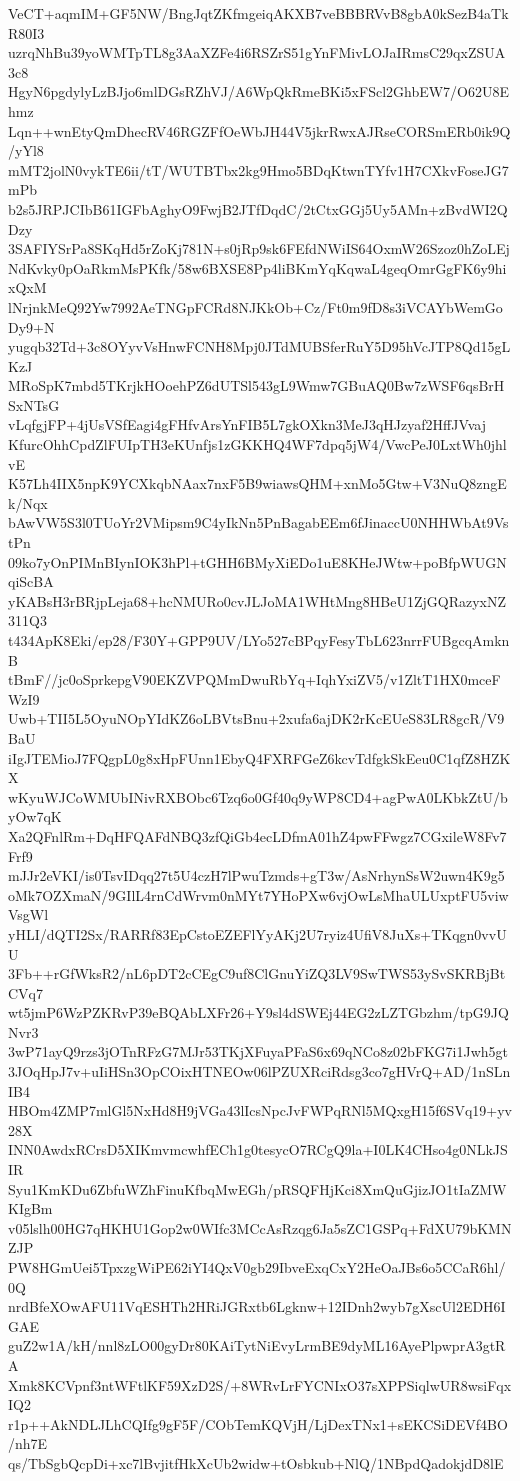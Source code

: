 VeCT+aqmIM+GF5NW/BngJqtZKfmgeiqAKXB7veBBBRVvB8gbA0kSezB4aTkR80I3
uzrqNhBu39yoWMTpTL8g3AaXZFe4i6RSZrS51gYnFMivLOJaIRmsC29qxZSUA3c8
HgyN6pgdylyLzBJjo6mlDGsRZhVJ/A6WpQkRmeBKi5xFScl2GhbEW7/O62U8Ehmz
Lqn++wnEtyQmDhecRV46RGZFfOeWbJH44V5jkrRwxAJRseCORSmERb0ik9Q/yYl8
mMT2jolN0vykTE6ii/tT/WUTBTbx2kg9Hmo5BDqKtwnTYfv1H7CXkvFoseJG7mPb
b2s5JRPJCIbB61IGFbAghyO9FwjB2JTfDqdC/2tCtxGGj5Uy5AMn+zBvdWI2QDzy
3SAFIYSrPa8SKqHd5rZoKj781N+s0jRp9sk6FEfdNWiIS64OxmW26Szoz0hZoLEj
NdKvky0pOaRkmMsPKfk/58w6BXSE8Pp4liBKmYqKqwaL4geqOmrGgFK6y9hixQxM
lNrjnkMeQ92Yw7992AeTNGpFCRd8NJKkOb+Cz/Ft0m9fD8s3iVCAYbWemGoDy9+N
yugqb32Td+3c8OYyvVsHnwFCNH8Mpj0JTdMUBSferRuY5D95hVcJTP8Qd15gLKzJ
MRoSpK7mbd5TKrjkHOoehPZ6dUTSl543gL9Wmw7GBuAQ0Bw7zWSF6qsBrHSxNTsG
vLqfgjFP+4jUsVSfEagi4gFHfvArsYnFIB5L7gkOXkn3MeJ3qHJzyaf2HffJVvaj
KfurcOhhCpdZlFUIpTH3eKUnfjs1zGKKHQ4WF7dpq5jW4/VwcPeJ0LxtWh0jhlvE
K57Lh4IIX5npK9YCXkqbNAax7nxF5B9wiawsQHM+xnMo5Gtw+V3NuQ8zngEk/Nqx
bAwVW5S3l0TUoYr2VMipsm9C4yIkNn5PnBagabEEm6fJinaccU0NHHWbAt9VstPn
09ko7yOnPIMnBIynIOK3hPl+tGHH6BMyXiEDo1uE8KHeJWtw+poBfpWUGNqiScBA
yKABsH3rBRjpLeja68+hcNMURo0cvJLJoMA1WHtMng8HBeU1ZjGQRazyxNZ311Q3
t434ApK8Eki/ep28/F30Y+GPP9UV/LYo527cBPqyFesyTbL623nrrFUBgcqAmknB
tBmF//jc0oSprkepgV90EKZVPQMmDwuRbYq+IqhYxiZV5/v1ZltT1HX0mceFWzI9
Uwb+TII5L5OyuNOpYIdKZ6oLBVtsBnu+2xufa6ajDK2rKcEUeS83LR8gcR/V9BaU
iIgJTEMioJ7FQgpL0g8xHpFUnn1EbyQ4FXRFGeZ6kcvTdfgkSkEeu0C1qfZ8HZKX
wKyuWJCoWMUbINivRXBObc6Tzq6o0Gf40q9yWP8CD4+agPwA0LKbkZtU/byOw7qK
Xa2QFnlRm+DqHFQAFdNBQ3zfQiGb4ecLDfmA01hZ4pwFFwgz7CGxileW8Fv7Frf9
mJJr2eVKI/is0TsvIDqq27t5U4czH7lPwuTzmds+gT3w/AsNrhynSsW2uwn4K9g5
oMk7OZXmaN/9GIlL4rnCdWrvm0nMYt7YHoPXw6vjOwLsMhaULUxptFU5viwVsgWl
yHLI/dQTI2Sx/RARRf83EpCstoEZEFlYyAKj2U7ryiz4UfiV8JuXs+TKqgn0vvUU
3Fb++rGfWksR2/nL6pDT2cCEgC9uf8ClGnuYiZQ3LV9SwTWS53ySvSKRBjBtCVq7
wt5jmP6WzPZKRvP39eBQAbLXFr26+Y9sl4dSWEj44EG2zLZTGbzhm/tpG9JQNvr3
3wP71ayQ9rzs3jOTnRFzG7MJr53TKjXFuyaPFaS6x69qNCo8z02bFKG7i1Jwh5gt
3JOqHpJ7v+uIiHSn3OpCOixHTNEOw06lPZUXRciRdsg3co7gHVrQ+AD/1nSLnIB4
HBOm4ZMP7mlGl5NxHd8H9jVGa43lIcsNpcJvFWPqRNl5MQxgH15f6SVq19+yv28X
INN0AwdxRCrsD5XIKmvmcwhfECh1g0tesycO7RCgQ9la+I0LK4CHso4g0NLkJSIR
Syu1KmKDu6ZbfuWZhFinuKfbqMwEGh/pRSQFHjKci8XmQuGjizJO1tIaZMWKIgBm
v05lslh00HG7qHKHU1Gop2w0WIfc3MCcAsRzqg6Ja5sZC1GSPq+FdXU79bKMNZJP
PW8HGmUei5TpxzgWiPE62iYI4QxV0gb29IbveExqCxY2HeOaJBs6o5CCaR6hl/0Q
nrdBfeXOwAFU11VqESHTh2HRiJGRxtb6Lgknw+12IDnh2wyb7gXscUl2EDH6IGAE
guZ2w1A/kH/nnl8zLO00gyDr80KAiTytNiEvyLrmBE9dyML16AyePlpwprA3gtRA
Xmk8KCVpnf3ntWFtlKF59XzD2S/+8WRvLrFYCNIxO37sXPPSiqlwUR8wsiFqxIQ2
r1p++AkNDLJLhCQIfg9gF5F/CObTemKQVjH/LjDexTNx1+sEKCSiDEVf4BO/nh7E
qs/TbSgbQcpDi+xc7lBvjitfHkXcUb2widw+tOsbkub+NlQ/1NBpdQadokjdD8lE
